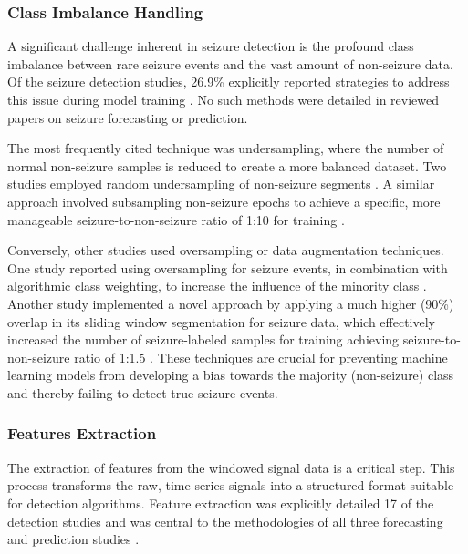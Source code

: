 \subsubsection{Class Imbalance Handling}
A significant challenge inherent in seizure detection is the profound class imbalance between rare seizure events and the vast amount of non-seizure data. Of the seizure detection studies, 26.9\% explicitly reported strategies to address this issue during model training \cite{Yu2023-ss, Wang2022-lt, Wu2024-yl, Nasseri2021-xn, Vakilna2024-hk, Larsen2024-vn, Tang2021-td}. No such methods were detailed in reviewed papers on seizure forecasting or prediction.

The most frequently cited technique was undersampling, where the number of normal non-seizure samples is reduced to create a more balanced dataset. Two studies employed random undersampling of non-seizure segments \cite{Yu2023-ss, Tang2021-td}. A similar approach involved subsampling non-seizure epochs to achieve a specific, more manageable seizure-to-non-seizure ratio of 1:10 for training \cite{Vakilna2024-hk}.

Conversely, other studies used oversampling or data augmentation techniques. One study reported using oversampling for seizure events, in combination with algorithmic class weighting, to increase the influence of the minority class \cite{Larsen2024-vn}. Another study implemented a novel approach by applying a much higher (90\%) overlap in its sliding window segmentation for seizure data, which effectively increased the number of seizure-labeled samples for training achieving seizure-to-non-seizure ratio of 1:1.5 \cite{Wang2022-lt}. These techniques are crucial for preventing machine learning models from developing a bias towards the majority (non-seizure) class and thereby failing to detect true seizure events.


\subsubsection{Features Extraction}
The extraction of features from the windowed signal data is a critical step. This process transforms the raw, time-series signals into a structured format suitable for detection algorithms. Feature extraction was explicitly detailed 17 of the detection studies \cite{Milosevic2016-ee, De_Cooman2018-pq, Hamlin2021-sd, Wang2022-lt, Poh2012-af, Wu2024-yl, Chowdhury2022-bi, Gheryani2017-yg, Ge2023-ab, Vakilna2024-hk, Larsen2024-vn, Dong2022-oo, Li2022-ty, Xu2022-tx, Wang2025-ql, Regalia2019-ch, Wang2025-my} and was central to the methodologies of all three forecasting and prediction studies \cite{Meisel2020-ii, Vieluf2023-zv, Vieluf2023-ta}.

